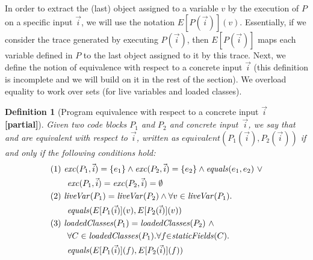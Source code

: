 \documentclass[conference]{IEEEtran}
\newtheorem{definition}{Definition}
\begin{document}
In order to extract the (last) object assigned to a variable $v$ by the execution of $P$ on a specific input $\vec{i}$,
we will use the notation $E[P(\vec{i})](v)$. Essentially, if we consider the trace generated by executing $P(\vec{i})$,
then $E[P(\vec{i})]$ maps each variable defined in $P$ to the last object assigned to it by this trace.
Next, we define the notion of equivalence with respect to a concrete input $\vec{i}$ (this definition is incomplete and we will build on it in the rest of the section).
We overload equality to work over sets (for live variables and loaded classes).

\begin{definition}[Program equivalence with respect to a concrete input $\vec{i}$ {\bf[partial]}]\label{def:prog-equiv}
  Given two code blocks $P_1$ and $P_2$ and concrete input~$\vec{i}$,
  we say that  and  are equivalent
  with respect to $\vec{i}$, written as $equivalent(P_1(\vec{i}), P_2(\vec{i}))$
  if and only if the following conditions hold:
%
%
\[
\begin{aligned}
  & (1)~ \mathit{{exc}}(P_1, \vec{i})=\{e_1\} \wedge \mathit{{exc}}(P_2, \vec{i})=\{e_2\} \wedge \mathit{{equals}}(e_1,e_2) ~\vee\\
  & \qquad \mathit{{exc}}(P_1, \vec{i})=\mathit{{exc}}(P_2, \vec{i}) =\emptyset \\ 
      & (2)~ \mathit{{liveVar}}(P_1) = \mathit{{liveVar}}(P_2) \wedge \forall v\in \mathit{{liveVar}}(P_1). \\
      & \qquad \mathit{{equals}}(E[P_1(\vec{i})](v), E[P_2(\vec{i})](v))\\
  & (3)~  \mathit{{loadedClasses}}(P_1) = \mathit{{loadedClasses}}(P_2) ~\wedge\\
  & \qquad \forall C \in \mathit{{loadedClasses}}(P_1). \forall f {\in} \mathit{{staticFields}}(C).\\
  & \qquad \mathit{{equals}}(E[P_1(\vec{i})](f), E[P_2(\vec{i})](f))
    \end{aligned}
    \]

 
  \end{definition}
\end{document}
